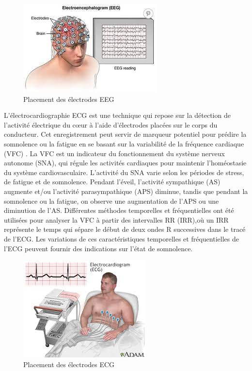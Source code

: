  \begin{figure}[H]
    \centering
    \includegraphics[]{img/EEG.jpg}
    \caption{Placement des électrodes EEG}
     
\end{figure}
L'électrocardiographie ECG est une technique qui repose sur la détection de l'activité électrique du cœur à l'aide d'électrodes placées sur le corps du conducteur. Cet enregistrement peut servir de marqueur potentiel pour prédire la somnolence ou la fatigue en se basant sur la variabilité de la fréquence cardiaque (VFC)\cite{abe2014development,zhang2012drowsiness} . La VFC est un indicateur du fonctionnement du système nerveux autonome (SNA), qui régule les activités cardiaques pour maintenir l'homéostasie du système cardiovasculaire. L'activité du SNA varie selon les périodes de stress, de fatigue et de somnolence. Pendant l'éveil, l'activité sympathique (AS) augmente et/ou l'activité parasympathique (APS) diminue, tandis que pendant la somnolence ou la fatigue, on observe une augmentation de l'APS ou une diminution de l'AS\cite{vicente2011detection}. Différentes méthodes temporelles et fréquentielles ont été utilisées pour analyser la VFC à partir des intervalles RR (IRR),où un IRR  représente le temps qui sépare le début de deux ondes R successives dans le tracé de l’ECG. Les variations de ces caractéristiques temporelles et fréquentielles de l'ECG peuvent fournir des indications sur l'état de somnolence.
 \begin{figure}[H]
    \centering
    \includegraphics[]{img/ECG.jpg}
    \caption{Placement des électrodes ECG}
     
\end{figure}
